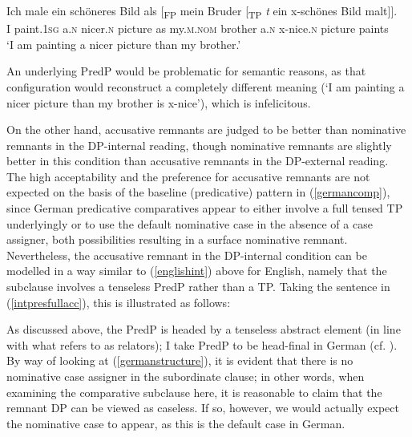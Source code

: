 \ea \gll Ich male ein schöneres Bild als [\textsubscript{FP} mein Bruder [\textsubscript{TP} \textit{t} ein x-schönes Bild malt]].\\
I paint.\textsc{1sg} a.\textsc{n} nicer.\textsc{n} picture as {} my.\textsc{m.nom} brother {} {} a.\textsc{n} x-nice.\textsc{n} picture paints\\
\glt `I am painting a nicer picture than my brother.'
\z

An underlying PredP would be problematic for semantic reasons, as that configuration would reconstruct a completely different meaning (`I am painting a nicer picture than my brother is x-nice'), which is infelicitous.

On the other hand, accusative remnants are judged to be better than nominative remnants in the DP-internal reading, though nominative remnants are slightly better in this condition than accusative remnants in the DP-external reading. The high acceptability and the preference for accusative remnants are not expected on the basis of the baseline (predicative) pattern in (\ref{germancomp}), since German predicative comparatives appear to either involve a full tensed TP underlyingly or to use the default nominative case in the absence of a case assigner, both possibilities resulting in a surface nominative remnant. Nevertheless, the accusative remnant in the DP-internal condition can be modelled in a way similar to (\ref{englishint}) above for English, namely that the subclause involves a tenseless PredP rather than a TP. Taking the sentence in (\ref{intpresfullacc}), this is illustrated as follows: 


As discussed above, the PredP is headed by a tenseless abstract element (in line with what \citealt{dendikken2006} refers to as relators); I take PredP to be head-final in German (cf. \citealt{salzmannschaden2019}). By way of looking at (\ref{germanstructure}), it is evident that there is no nominative case assigner in the subordinate clause; in other words, when examining the comparative subclause here, it is reasonable to claim that the remnant DP can be viewed as caseless. If so, however, we would actually expect the nominative case to appear, as this is the default case in German.

